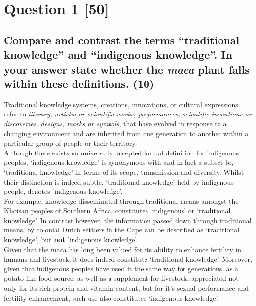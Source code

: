 \documentclass[11pt]{article}
\begin{document}
\section{Question 1 [50]}
\label{sec:org1cc554b}

\cite{simelane09_african_trad_knowl_sys_biodiv_manag,saurombe09_protection_indigenous_trad_knowl_through_ip,masango14_trad_knowl_cultural_express_protect,masango10_indigenous_trad_knowl_protect_prospects,amechi15_trad_knowl_medical_uses_plants_pat_sa,amechi15_leverag_trad_knowl_medicinal,geyer10_towards_clearer_defin_underst_indi,rsa78_patents_act,wto17_trips}
\subsection{Compare and contrast the terms ``traditional knowledge'' and ``indigenous knowledge''. In your answer state whether the \emph{maca} plant falls within these definitions. (10)}
\label{sec:orgbad1248}
Traditional knowledge systems, creations, innovations, or cultural expressions
refer to \emph{literary, artistic or scientific works, performances, scientific
inventions or discoveries, designs, marks or symbols}, that have evolved in
response to a changing environment and are inherited from one generation to
another within a particular group of people or their territory.\\

Although there exists no universally accepted formal definition for indigenous
peoples, `indigenous knowledge' is synonymous with and in fact a subset to,
`traditional knowledge' in terms of its scope, transmission and diversity.
Whilst their distinction is indeed subtle, `traditional knowledge' held by
indigenous people, denotes `indigenous knowledge'.\\

For example, knowledge disseminated through traditional means amongst the
Khoisan peoples of Southern Africa, constitutes `indigenous' or `traditional
knowledge'. In contrast however, the information passed down through traditional
means, by colonial Dutch settlers in the Cape can be described as `traditional
knowledge', but \textbf{not} 'indigenous knowledge'.\\

Given that the maca has long been valued for its ability to enhance fertility in
humans and livestock, it does indeed constitute `traditional knowledge'.
Moreover, given that indigenous peoples have used it the same way for
generations, as a potato-like food source, as well as a supplement for
livestock, appreciated not only for its rich protein and vitamin content, but
for it's sexual performance and fertility enhancement, such use also constitutes
`indigenous knowledge'.
\end{document}

